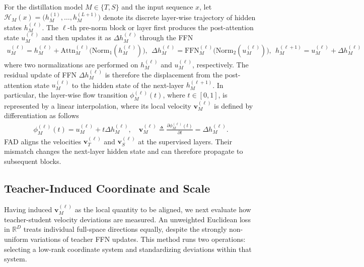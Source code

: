 \documentclass{article}
\newcommand{\R}{\mathbb{R}}
\newcommand{\calH}{\mathcal{H}}
\newcommand{\Attn}{\mathrm{Attn}}
\newcommand{\Norm}{\mathrm{Norm}}
\newcommand{\FFN}{\mathrm{FFN}}
\newcommand{\bv}{\boldsymbol{v}}
\theoremstyle{plain}
\theoremstyle{definition}
\theoremstyle{remark}
\begin{document}
For the distillation model $M\in\{T,S\}$ and the input sequence $x$, let $\calH_M(x)=\bigl(h_M^{(1)},\ldots,h_M^{(L+1)}\bigr)$ denote its discrete layer-wise trajectory of hidden states $h_M^{(\ell)}$. The $\ell$-th pre-norm block or layer first produces the post-attention state $u_M^{(\ell)}$ and then updates it as $\Delta h_M^{(\ell)}$ through the FFN
\begin{equation} \begin{aligned}
  u_M^{(\ell)} = h_M^{(\ell)} + \Attn_M^{(\ell)} \bigl(
    \Norm_1(h_M^{(\ell)}) \bigr),~~ \Delta h_M^{(\ell)} =
  \FFN_M^{(\ell)} \bigl( \Norm_2(u_M^{(\ell)}) \bigr),~~
  h_M^{(\ell+1)} = u_M^{(\ell)} + \Delta h_M^{(\ell)}
\end{aligned} \label{eq:block-transition} \end{equation}
where two normalizations are performed on $h_M^{(\ell)}$ and $u_M^{(\ell)}$, respectively. The residual update of FFN $\Delta h_M^{(\ell)}$ is therefore the displacement from the post-attention state $u_M^{(\ell)}$ to the hidden state of the next-layer $h_M^{(\ell+1)}$. In particular, the layer-wise flow transition $\phi_M^{(\ell)}(t)$, where $t\in[0,1]$, is represented by a linear interpolation, where its local velocity $\bv_M^{(\ell)}$ is defined by differentiation as follows
\begin{equation} \begin{aligned}
  \phi_M^{(\ell)}(t) = u_M^{(\ell)} + t\Delta h_M^{(\ell)},\quad \bv_M^{(\ell)} \triangleq \frac{\partial\phi_M^{(\ell)}(t)} {\partial t} = \Delta h_M^{(\ell)}.
\end{aligned} \label{eq:local-velocity} \end{equation}
FAD aligns the velocities $\bv_T^{(\ell)}$ and $\bv_S^{(\ell)}$ at the supervised layers. Their mismatch changes the next-layer hidden state and can therefore propagate to subsequent blocks.

\subsection{Teacher-Induced Coordinate and Scale}
\label{sec:geometry}

Having induced $\bv_M^{(\ell)}$ as the local quantity to be aligned, we next evaluate how teacher-student velocity deviations are measured. An unweighted Euclidean loss in $\R^D$ treats individual full-space directions equally, despite the strongly non-uniform variations of teacher FFN updates. This method runs two operations: selecting a low-rank coordinate system and standardizing deviations within that system.
\end{document}

